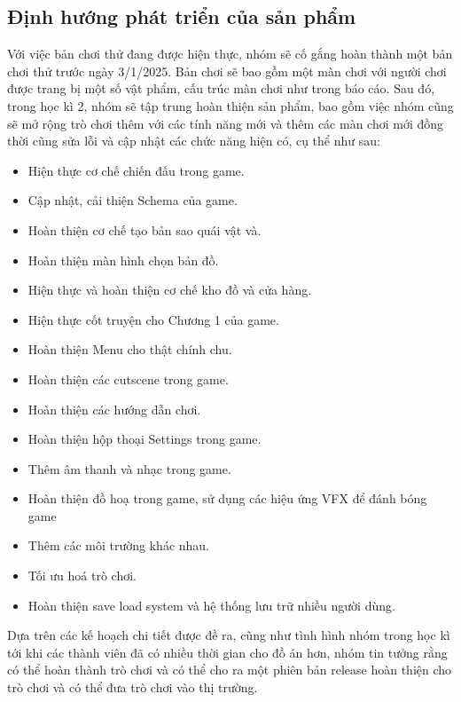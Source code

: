 \subsection{Định hướng phát triển của sản phẩm}
\hspace*{1cm} Với việc bản chơi thử đang được hiện thực, nhóm sẽ cố gắng hoàn thành một bản chơi thử trước ngày 3/1/2025. Bản chơi sẽ bao gồm một màn chơi với người chơi được trang bị một số vật phẩm, cấu trúc màn chơi như trong báo cáo. Sau đó, trong học kì 2, nhóm sẽ tập trung hoàn thiện sản phẩm, bao gồm việc nhóm cũng sẽ mở rộng trò chơi thêm với các tính năng mới và thêm các màn chơi mới đồng thời cũng sửa lỗi và cập nhật các chức năng hiện có, cụ thể như sau:
\begin{itemize}
	\item Hiện thực cơ chế chiến đấu trong game.
	\item Cập nhật, cải thiện Schema của game.
	\item Hoàn thiện cơ chế tạo bản sao quái vật và.
	\item Hoàn thiện màn hình chọn bản đồ.
	\item Hiện thực và hoàn thiện cơ chế kho đồ và cửa hàng.
	\item Hiện thực cốt truyện cho Chương 1 của game.
	\item Hoàn thiện Menu cho thật chính chu.
	\item Hoàn thiện các cutscene trong game.
	\item Hoàn thiện các hướng dẫn chơi.
	\item Hoàn thiện hộp thoại Settings trong game.
	\item Thêm âm thanh và nhạc trong game.
	\item Hoàn thiện đồ hoạ trong game, sử dụng các hiệu ứng VFX để đánh bóng game
	\item Thêm các môi trường khác nhau.
	\item Tối ưu hoá trò chơi.
	\item Hoàn thiện save load system và hệ thống lưu trữ nhiều người dùng.
\end{itemize}
\hspace*{1cm} Dựa trên các kế hoạch chi tiết được đề ra, cũng như tình hình nhóm trong học kì tới khi các thành viên đã có nhiều thời gian cho đồ án hơn, nhóm tin tưởng rằng có thể hoàn thành trò chơi và có thể cho ra một phiên bản release hoàn thiện cho trò chơi và có thể đưa trò chơi vào thị trường.